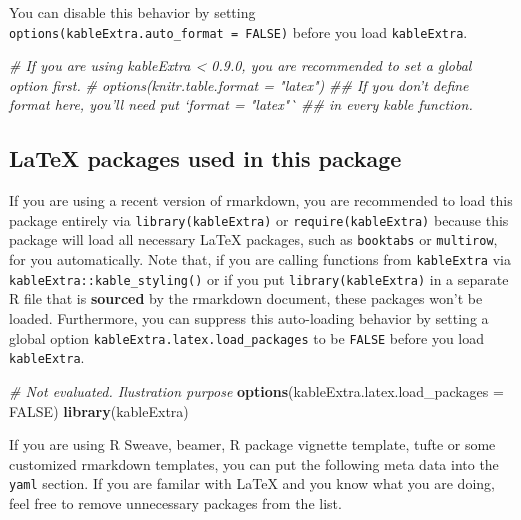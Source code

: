 \documentclass[table]{article}
\newenvironment{Shaded}{\begin{snugshade}}{\end{snugshade}}
\newcommand{\CommentTok}[1]{\textcolor[rgb]{0.56,0.35,0.01}{\textit{#1}}}
\newcommand{\DataTypeTok}[1]{\textcolor[rgb]{0.13,0.29,0.53}{#1}}
\newcommand{\KeywordTok}[1]{\textcolor[rgb]{0.13,0.29,0.53}{\textbf{#1}}}
\newcommand{\NormalTok}[1]{#1}
\newcommand{\OtherTok}[1]{\textcolor[rgb]{0.56,0.35,0.01}{#1}}
\begin{document}
You can disable this behavior by setting
\texttt{options(kableExtra.auto\_format\ =\ FALSE)} before you load
\texttt{kableExtra}.

\begin{Shaded}
\begin{Highlighting}[]
\CommentTok{# If you are using kableExtra < 0.9.0, you are recommended to set a global option first.}
\CommentTok{# options(knitr.table.format = "latex") }
\CommentTok{## If you don't define format here, you'll need put `format = "latex"` }
\CommentTok{## in every kable function.}
\end{Highlighting}
\end{Shaded}

\hypertarget{latex-packages-used-in-this-package}{%
\subsection{LaTeX packages used in this
package}\label{latex-packages-used-in-this-package}}

If you are using a recent version of rmarkdown, you are recommended to
load this package entirely via \texttt{library(kableExtra)} or
\texttt{require(kableExtra)} because this package will load all
necessary LaTeX packages, such as \texttt{booktabs} or
\texttt{multirow}, for you automatically. Note that, if you are calling
functions from \texttt{kableExtra} via
\texttt{kableExtra::kable\_styling()} or if you put
\texttt{library(kableExtra)} in a separate R file that is
\textbf{sourced} by the rmarkdown document, these packages won't be
loaded. Furthermore, you can suppress this auto-loading behavior by
setting a global option \texttt{kableExtra.latex.load\_packages} to be
\texttt{FALSE} before you load \texttt{kableExtra}.

\begin{Shaded}
\begin{Highlighting}[]
\CommentTok{# Not evaluated. Ilustration purpose}
\KeywordTok{options}\NormalTok{(}\DataTypeTok{kableExtra.latex.load_packages =} \OtherTok{FALSE}\NormalTok{)}
\KeywordTok{library}\NormalTok{(kableExtra)}
\end{Highlighting}
\end{Shaded}

If you are using R Sweave, beamer, R package vignette template, tufte or
some customized rmarkdown templates, you can put the following meta data
into the \texttt{yaml} section. If you are familar with LaTeX and you
know what you are doing, feel free to remove unnecessary packages from
the list.
\end{document}
